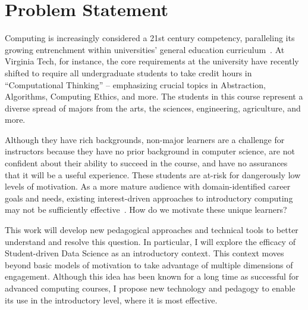 \section{Problem Statement}

Computing is increasingly considered a 21st century competency, paralleling its growing entrenchment within universities’ general education curriculum~\cite{wing2006}.
At Virginia Tech, for instance, the core requirements at the university have recently shifted to require all undergraduate students to take credit hours in ``Computational Thinking'' -- emphasizing crucial topics in Abstraction, Algorithms, Computing Ethics, and more.
The students in this course represent a diverse spread of majors from the arts, the sciences, engineering, agriculture, and more.

Although they have rich backgrounds, non-major learners are a challenge for instructors because they have no prior background in computer science, are not confident about their ability to succeed in the course, and have no assurances that it will be a useful experience.
These students are at-risk for dangerously low levels of motivation.
As a more mature audience with domain-identified career goals and needs, existing interest-driven approaches to introductory computing may not be sufficiently effective~\cite{guzdial2006imagineering}.
How do we motivate these unique learners?

This work will develop new pedagogical approaches and technical tools to better understand and resolve this question.
In particular, I will explore the efficacy of Student-driven Data Science as an introductory context.
This context moves beyond basic models of motivation to take advantage of multiple dimensions of engagement.
Although this idea has been known for a long time as successful for advanced computing courses, I propose new technology and pedagogy to enable its use in the introductory level, where it is most effective.
